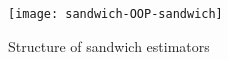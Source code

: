 \documentclass{Z}
\begin{document}
\begin{figure}[tbh]
\begin{center}
\texttt{[image: sandwich-OOP-sandwich]}
\caption{\label{fig:sandwich} Structure of sandwich estimators}
\end{center}
\end{figure}



\end{document}
